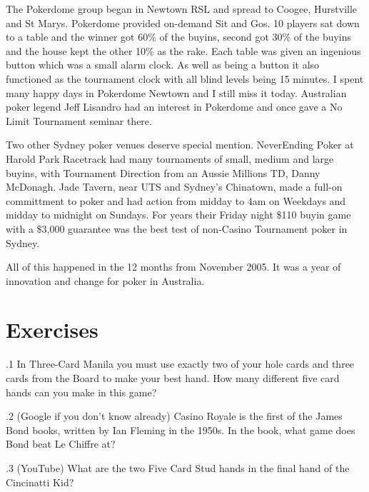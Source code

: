 
The Pokerdome group began in Newtown RSL and spread to Coogee,
Hurstville and St Marys. Pokerdome provided on-demand Sit and Gos.
10 players sat down to a table and the winner got 60\% of the buyins,
second got 30\% of the buyins and the house kept the other 10\% as the
rake. Each table was given an ingenious button which was a small
alarm clock. As well as being a button it also functioned
as the tournament clock with all blind levels being 15 minutes.
I spent many happy days in Pokerdome Newtown and I still miss it
today. Australian poker legend Jeff Lisandro had an interest in
Pokerdome and once gave a No Limit Tournament seminar there.

Two other Sydney poker venues deserve special mention. NeverEnding
Poker at Harold Park Racetrack had many tournaments of small, medium
and large buyins, with Tournament Direction from an Aussie Millions
TD, Danny McDonagh. Jade Tavern, near UTS and Sydney's Chinatown, made
a full-on committment to poker and had action from midday to 4am on
Weekdays and midday to midnight on Sundays. For years their Friday
night \$110 buyin game with a \$3,000 guarantee was the best test of
non-Casino Tournament poker in Sydney.

All of this happened in the 12 months from November 2005. It was a
year of innovation and change for poker in Australia.


\section{Exercises}

.1 In Three-Card Manila you must use exactly two of
your hole cards and three cards from the Board to make your best
hand. How many different five card hands can you make in this game?

.2 (Google if you don't know already) Casino Royale
is the first of the James Bond books, written by Ian Fleming in the
1950s. In the book, what game does Bond beat Le Chiffre at?

.3 (YouTube) What are the two Five Card Stud hands in
the final hand of the Cincinatti Kid?
